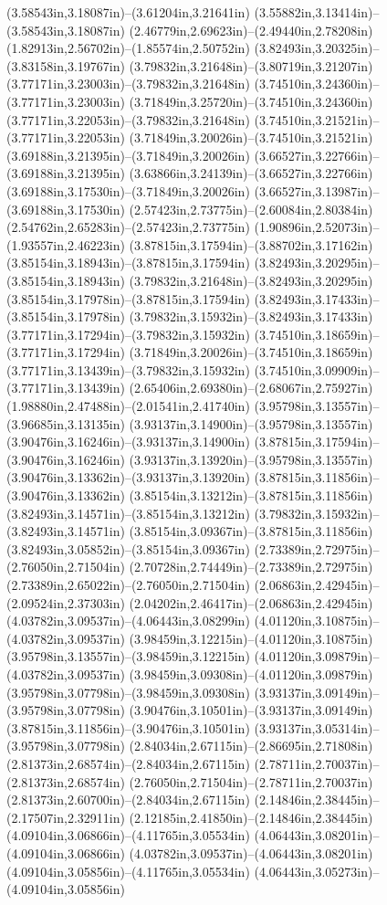 (3.58543in,3.18087in)--(3.61204in,3.21641in) (3.55882in,3.13414in)--(3.58543in,3.18087in) (2.46779in,2.69623in)--(2.49440in,2.78208in) (1.82913in,2.56702in)--(1.85574in,2.50752in) (3.82493in,3.20325in)--(3.83158in,3.19767in) (3.79832in,3.21648in)--(3.80719in,3.21207in) (3.77171in,3.23003in)--(3.79832in,3.21648in) (3.74510in,3.24360in)--(3.77171in,3.23003in) (3.71849in,3.25720in)--(3.74510in,3.24360in) (3.77171in,3.22053in)--(3.79832in,3.21648in) (3.74510in,3.21521in)--(3.77171in,3.22053in) (3.71849in,3.20026in)--(3.74510in,3.21521in) (3.69188in,3.21395in)--(3.71849in,3.20026in) (3.66527in,3.22766in)--(3.69188in,3.21395in) (3.63866in,3.24139in)--(3.66527in,3.22766in) (3.69188in,3.17530in)--(3.71849in,3.20026in) (3.66527in,3.13987in)--(3.69188in,3.17530in) (2.57423in,2.73775in)--(2.60084in,2.80384in) (2.54762in,2.65283in)--(2.57423in,2.73775in) (1.90896in,2.52073in)--(1.93557in,2.46223in) (3.87815in,3.17594in)--(3.88702in,3.17162in) (3.85154in,3.18943in)--(3.87815in,3.17594in) (3.82493in,3.20295in)--(3.85154in,3.18943in) (3.79832in,3.21648in)--(3.82493in,3.20295in) (3.85154in,3.17978in)--(3.87815in,3.17594in) (3.82493in,3.17433in)--(3.85154in,3.17978in) (3.79832in,3.15932in)--(3.82493in,3.17433in) (3.77171in,3.17294in)--(3.79832in,3.15932in) (3.74510in,3.18659in)--(3.77171in,3.17294in) (3.71849in,3.20026in)--(3.74510in,3.18659in) (3.77171in,3.13439in)--(3.79832in,3.15932in) (3.74510in,3.09909in)--(3.77171in,3.13439in) (2.65406in,2.69380in)--(2.68067in,2.75927in) (1.98880in,2.47488in)--(2.01541in,2.41740in) (3.95798in,3.13557in)--(3.96685in,3.13135in) (3.93137in,3.14900in)--(3.95798in,3.13557in) (3.90476in,3.16246in)--(3.93137in,3.14900in) (3.87815in,3.17594in)--(3.90476in,3.16246in) (3.93137in,3.13920in)--(3.95798in,3.13557in) (3.90476in,3.13362in)--(3.93137in,3.13920in) (3.87815in,3.11856in)--(3.90476in,3.13362in) (3.85154in,3.13212in)--(3.87815in,3.11856in) (3.82493in,3.14571in)--(3.85154in,3.13212in) (3.79832in,3.15932in)--(3.82493in,3.14571in) (3.85154in,3.09367in)--(3.87815in,3.11856in) (3.82493in,3.05852in)--(3.85154in,3.09367in) (2.73389in,2.72975in)--(2.76050in,2.71504in) (2.70728in,2.74449in)--(2.73389in,2.72975in) (2.73389in,2.65022in)--(2.76050in,2.71504in) (2.06863in,2.42945in)--(2.09524in,2.37303in) (2.04202in,2.46417in)--(2.06863in,2.42945in) (4.03782in,3.09537in)--(4.06443in,3.08299in) (4.01120in,3.10875in)--(4.03782in,3.09537in) (3.98459in,3.12215in)--(4.01120in,3.10875in) (3.95798in,3.13557in)--(3.98459in,3.12215in) (4.01120in,3.09879in)--(4.03782in,3.09537in) (3.98459in,3.09308in)--(4.01120in,3.09879in) (3.95798in,3.07798in)--(3.98459in,3.09308in) (3.93137in,3.09149in)--(3.95798in,3.07798in) (3.90476in,3.10501in)--(3.93137in,3.09149in) (3.87815in,3.11856in)--(3.90476in,3.10501in) (3.93137in,3.05314in)--(3.95798in,3.07798in) (2.84034in,2.67115in)--(2.86695in,2.71808in) (2.81373in,2.68574in)--(2.84034in,2.67115in) (2.78711in,2.70037in)--(2.81373in,2.68574in) (2.76050in,2.71504in)--(2.78711in,2.70037in) (2.81373in,2.60700in)--(2.84034in,2.67115in) (2.14846in,2.38445in)--(2.17507in,2.32911in) (2.12185in,2.41850in)--(2.14846in,2.38445in) (4.09104in,3.06866in)--(4.11765in,3.05534in) (4.06443in,3.08201in)--(4.09104in,3.06866in) (4.03782in,3.09537in)--(4.06443in,3.08201in) (4.09104in,3.05856in)--(4.11765in,3.05534in) (4.06443in,3.05273in)--(4.09104in,3.05856in) 